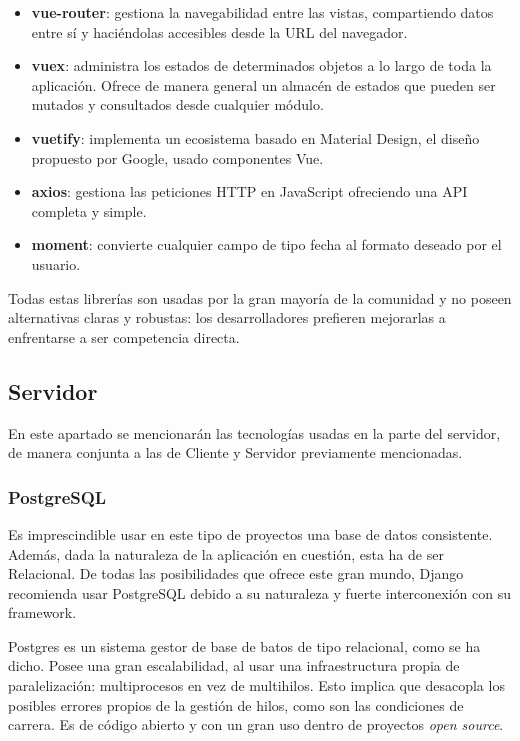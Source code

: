 \begin{itemize}
    \item \textbf{vue-router}: gestiona la navegabilidad entre las vistas, compartiendo datos entre sí y haciéndolas accesibles desde la URL del navegador.
    \item \textbf{vuex}: administra los estados de determinados objetos a lo largo de toda la aplicación. Ofrece de manera general un almacén de estados que pueden ser mutados y consultados desde cualquier módulo.
    \item \textbf{vuetify}: implementa un ecosistema basado en Material Design, el diseño propuesto por Google, usado componentes Vue.
    \item \textbf{axios}: gestiona las peticiones HTTP en JavaScript ofreciendo una API completa y simple.
    \item \textbf{moment}: convierte cualquier campo de tipo fecha al formato deseado por el usuario.
\end{itemize}

Todas estas librerías son usadas por la gran mayoría de la comunidad y no poseen alternativas claras y robustas: los desarrolladores prefieren mejorarlas a enfrentarse a ser competencia directa.

\subsection{Servidor}

En este apartado se mencionarán las tecnologías usadas en la parte del servidor, de manera conjunta a las de Cliente y Servidor previamente mencionadas.

\subsubsection{PostgreSQL}

Es imprescindible usar en este tipo de proyectos una base de datos consistente. Además, dada la naturaleza de la aplicación en cuestión, esta ha de ser Relacional. De todas las posibilidades que ofrece este gran mundo, Django recomienda usar PostgreSQL debido a su naturaleza y fuerte interconexión con su framework.

Postgres es un sistema gestor de base de batos de tipo relacional, como se ha dicho. Posee una gran escalabilidad, al usar una infraestructura propia de paralelización: multiprocesos en vez de multihilos. Esto implica que desacopla los posibles errores propios de la gestión de hilos, como son las condiciones de carrera. Es de código abierto y con un gran uso dentro de proyectos \textit{open source}.

